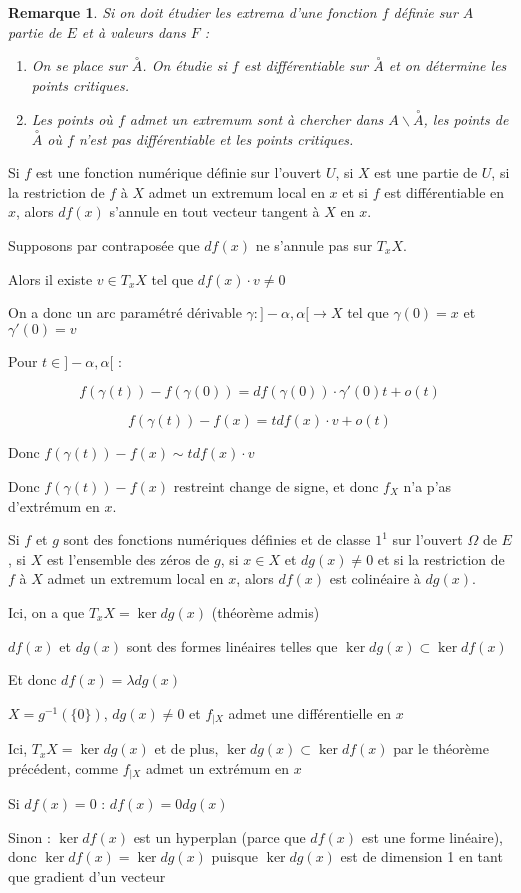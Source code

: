 \documentclass[a4paper,12pt]{book}
\newcommand{\Thr}[2]{\begin{tcolorbox}[sharp corners, colback=white,colframe=red!90!black!75, title=Théorème : #1]#2\end{tcolorbox}}
\newcommand{\Prop}[2]{\begin{tcolorbox}[sharp corners, colback=white,colframe=red!90!black!75, title=Proposition : #1]#2\end{tcolorbox}}
\newcommand{\Pre}[1]{\begin{tcolorbox}[sharp corners, colback=white,colframe=green!60!green!30!black!75, title=Preuve]#1\end{tcolorbox}}
\newtheorem{Rem}{Remarque}[section]
\begin{document}
\begin{Rem}
Si on doit étudier les extrema d'une fonction $f$ définie sur $A$ partie de $E$ et à valeurs dans $F$ :\begin{enumerate}
\item On se place sur $\overset{\circ}{A}$. On étudie si $f$ est différentiable sur $\overset{\circ}{A}$ et on détermine les points critiques.
\item Les points où $f$ admet un extremum sont à chercher dans $A\backslash\overset{\circ}{A}$, les points de $\overset{\circ}{A}$ où $f$ n'est pas différentiable et les points critiques.
\end{enumerate}
\end{Rem}
\Prop{}{Si $f$ est une fonction numérique définie sur l'ouvert $U$, si $X$ est une partie de $U$, si la restriction de $f$ à $X$ admet un extremum local en $x$ et si $f$ est différentiable en $x$, alors $df(x)$ s'annule en tout vecteur tangent à $X$ en $x$.}
\Pre{Supposons par contraposée que $df(x)$ ne s'annule pas sur $T_xX$.
\par Alors il existe $v\in T_xX$ tel que $df(x)\cdot v\neq 0$
\par On a donc un arc paramétré dérivable $\gamma:]-\alpha,\alpha[\to X$ tel que $\gamma(0)=x$ et $\gamma'(0)=v$
\par Pour $t\in]-\alpha, \alpha[$ :
\par $$f(\gamma(t)) - f(\gamma(0)) = df(\gamma(0))\cdot \gamma'(0)t + o(t)$$
\par $$f(\gamma(t))-f(x) = tdf(x)\cdot v + o(t)$$
\par Donc $f(\gamma(t))-f(x)\sim tdf(x)\cdot v$
\par Donc $f(\gamma(t))-f(x)$ restreint change de signe, et donc $f_X$ n'a p'as d'extrémum en $x$.}
\Thr{optimisation sous une contrainte}{Si $f$ et $g$ sont des fonctions numériques définies et de classe $\mathcal{1}^1$ sur l'ouvert $\Omega$ de $E$, si $X$ est l'ensemble des zéros de $g$, si $x\in X$ et $dg(x)\neq 0$ et si la restriction de $f$ à $X$ admet un extremum local en $x$, alors $df(x)$ est colinéaire à $dg(x)$.}
\Pre{Ici, on a que $T_xX=\ker dg(x)$ (théorème admis)
\par $df(x)$ et $dg(x)$ sont des formes linéaires telles que $\ker dg(x)\subset \ker df(x)$
\par Et donc $df(x) = \lambda dg(x)$
\par $X = g^{-1}(\{0\})$, $dg(x)\neq 0$ et $f_{|X}$ admet une différentielle en $x$
\par Ici, $T_xX = \ker dg(x)$ et de plus, $\ker dg(x)\subset\ker df(x)$ par le théorème précédent, comme $f_{|X}$ admet un extrémum en $x$
\par Si $df(x)=0$ : $df(x) = 0dg(x)$
\par Sinon : $\ker df(x)$ est un hyperplan (parce que $df(x)$ est une forme linéaire), donc $\ker df(x) = \ker dg(x)$ puisque $\ker dg(x)$ est de dimension 1 en tant que gradient d'un vecteur}
\end{document}
